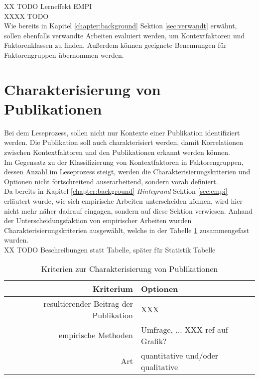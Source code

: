 XX TODO Lerneffekt EMPI \\

XXXX TODO \\
Wie bereits in Kapitel \ref{chapter:background} Sektion \ref{sec:verwandt} erwähnt, sollen ebenfalls verwandte Arbeiten evaluiert werden, um Kontextfaktoren und Faktorenklassen zu finden. Außerdem können geeignete Benennungen für Faktorengruppen  übernommen werden.


\section{Charakterisierung von Publikationen}
\label{sec:character}

Bei dem Leseprozess, sollen nicht nur Kontexte einer Publikation identifiziert werden. Die Publikation soll auch charakterisiert werden, damit Korrelationen zwischen Kontextfaktoren und den Publikationen erkannt werden können. \\

Im Gegensatz zu der Klassifizierung von Kontextfaktoren in Faktorengruppen, dessen Anzahl im Leseprozess steigt, werden die Charakterisierungskriterien und Optionen nicht fortschreitend auserarbeitend, sondern vorab definiert. \\
Da bereits in Kapitel \ref{chapter:background} \textit{Hintegrund} Sektion \ref{sec:empi} erläutert wurde, wie sich empirische Arbeiten unterscheiden können, wird hier nicht mehr näher dadrauf eingagen, sondern auf diese Sektion verwiesen. Anhand der Unterscheidungsfaktion von empirischer Arbeiten wurden Charakterisierungskriterien ausgewählt, welche in der Tabelle \ref{table:character} zusammengefast wurden. \\

XX TODO Beschreibungen statt Tabelle, später für Statistik Tabelle \\
\begin{table}[h!]
\begin{tabular}{ r | l }
 Kriterium & Optionen \\ 
  \hline
  resultierender Beitrag der Publikation & XXX \\  
  empirische Methoden & Umfrage, ... XXX ref auf Grafik? \\
  Art & quantitative und/oder qualitative \\
\end{tabular}
\caption{Kriterien zur Charakterisierung von Publikationen}
\label{table:character}
\end{table}





